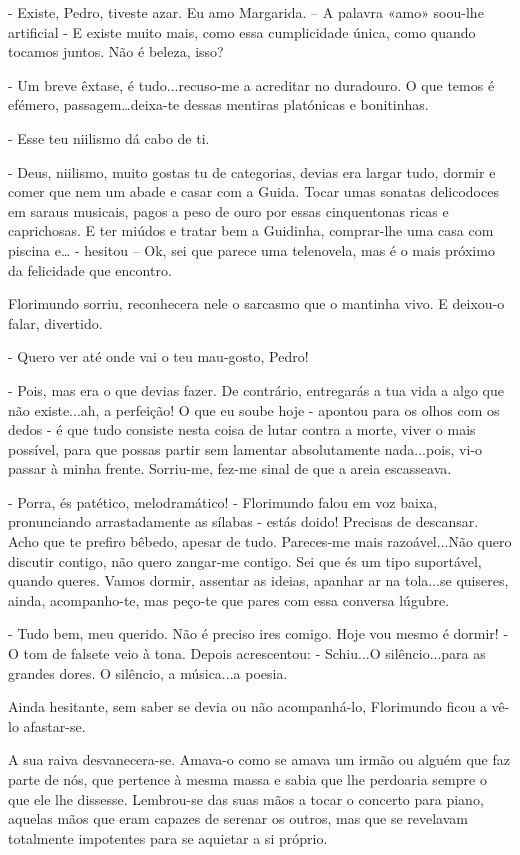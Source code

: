 - Existe, Pedro, tiveste azar. Eu amo Margarida. -- A palavra «amo»
soou-lhe artificial - E existe muito mais, como essa cumplicidade única,
como quando tocamos juntos. Não é beleza, isso?

- Um breve êxtase, é tudo...recuso-me a acreditar no duradouro. O que
temos é efémero, passagem\ldots{}deixa-te dessas mentiras platónicas e
bonitinhas.

- Esse teu niilismo dá cabo de ti.

- Deus, niilismo, muito gostas tu de categorias, devias era largar tudo,
dormir e comer que nem um abade e casar com a Guida. Tocar umas sonatas
delicodoces em saraus musicais, pagos a peso de ouro por essas
cinquentonas ricas e caprichosas. E ter miúdos e tratar bem a Guidinha,
comprar-lhe uma casa com piscina e\ldots{} - hesitou -- Ok, sei que
parece uma telenovela, mas é o mais próximo da felicidade que encontro.

Florimundo sorriu, reconhecera nele o sarcasmo que o mantinha vivo. E
deixou-o falar, divertido.

- Quero ver até onde vai o teu mau-gosto, Pedro!

- Pois, mas era o que devias fazer. De contrário, entregarás a tua vida
a algo que não existe...ah, a perfeição! O que eu soube hoje - apontou
para os olhos com os dedos - é que tudo consiste nesta coisa de lutar
contra a morte, viver o mais possível, para que possas partir sem
lamentar absolutamente nada...pois, vi-o passar à minha frente.
Sorriu-me, fez-me sinal de que a areia escasseava.

- Porra, és patético, melodramático! - Florimundo falou em voz baixa,
pronunciando arrastadamente as sílabas - estás doido! Precisas de
descansar. Acho que te prefiro bêbedo, apesar de tudo. Pareces-me mais
razoável...Não quero discutir contigo, não quero zangar-me contigo. Sei
que és um tipo suportável, quando queres. Vamos dormir, assentar as
ideias, apanhar ar na tola...se quiseres, ainda, acompanho-te, mas
peço-te que pares com essa conversa lúgubre.

- Tudo bem, meu querido. Não é preciso ires comigo. Hoje vou mesmo é
dormir! - O tom de falsete veio à tona. Depois acrescentou: - Schiu...O
silêncio...para as grandes dores. O silêncio, a música...a poesia.

Ainda hesitante, sem saber se devia ou não acompanhá-lo, Florimundo
ficou a vê-lo afastar-se.

A sua raiva desvanecera-se. Amava-o como se amava um irmão ou alguém que
faz parte de nós, que pertence à mesma massa e sabia que lhe perdoaria
sempre o que ele lhe dissesse. Lembrou-se das suas mãos a tocar o
concerto para piano, aquelas mãos que eram capazes de serenar os outros,
mas que se revelavam totalmente impotentes para se aquietar a si
próprio.

